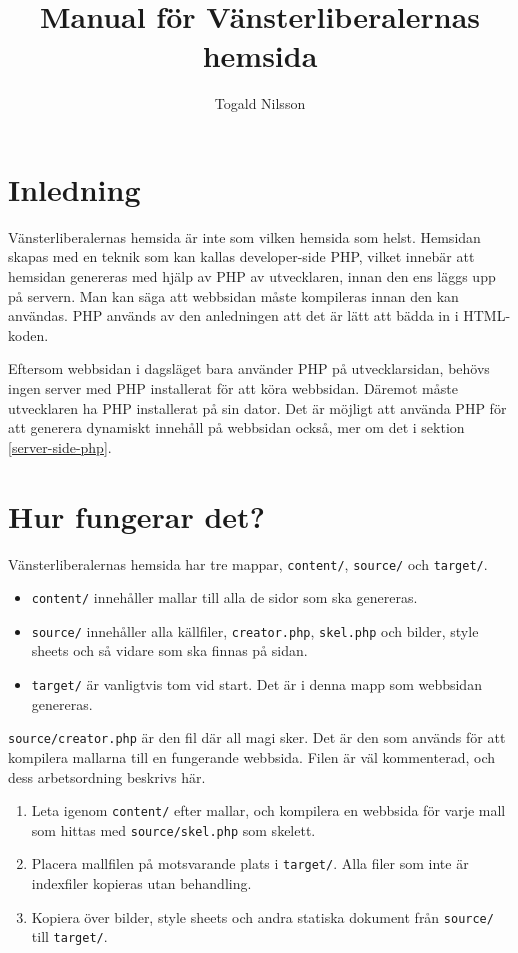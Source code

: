 \documentclass[a4paper,10pt]{article}
\author{Togald Nilsson}
\title{\textbf{Manual för Vänsterliberalernas hemsida}}
\begin{document}
\maketitle
\tableofcontents
\pagebreak

\section{Inledning}
Vänsterliberalernas hemsida är inte som vilken hemsida som helst. Hemsidan skapas med en teknik som kan kallas developer-side PHP, vilket innebär att hemsidan genereras med hjälp av PHP av utvecklaren, innan den ens läggs upp på servern. Man kan säga att webbsidan måste kompileras innan den kan användas. PHP används av den anledningen att det är lätt att bädda in i HTML-koden. 

Eftersom webbsidan i dagsläget bara använder PHP på utvecklarsidan, behövs ingen server med PHP installerat för att köra webbsidan. Däremot måste utvecklaren ha PHP installerat på sin dator. Det är möjligt att använda PHP för att generera dynamiskt innehåll på webbsidan också, mer om det i sektion \ref{server-side-php}.

\section{Hur fungerar det?}
Vänsterliberalernas hemsida har tre mappar, {\tt content/}, {\tt source/} och {\tt target/}. 

\begin{itemize}
	\item {\tt content/} innehåller mallar till alla de sidor som ska genereras. 
	\item {\tt source/} innehåller alla källfiler, {\tt creator.php}, {\tt skel.php} och bilder, style sheets och så vidare som ska finnas på sidan. 
	\item {\tt target/} är vanligtvis tom vid start. Det är i denna mapp som webbsidan genereras. 
\end{itemize}

{\tt source/creator.php} är den fil där all magi sker. Det är den som används för att kompilera mallarna till en fungerande webbsida. Filen är väl kommenterad, och dess arbetsordning beskrivs här. 

\begin{enumerate}
	\item Leta igenom {\tt content/} efter mallar, och kompilera en webbsida för varje mall som hittas med {\tt source/skel.php} som skelett. 
	\item Placera mallfilen på motsvarande plats i {\tt target/}. Alla filer som inte är indexfiler kopieras utan behandling. 
	\item Kopiera över bilder, style sheets och andra statiska dokument från {\tt source/} till {\tt target/}.
\end{enumerate}
\end{document}
